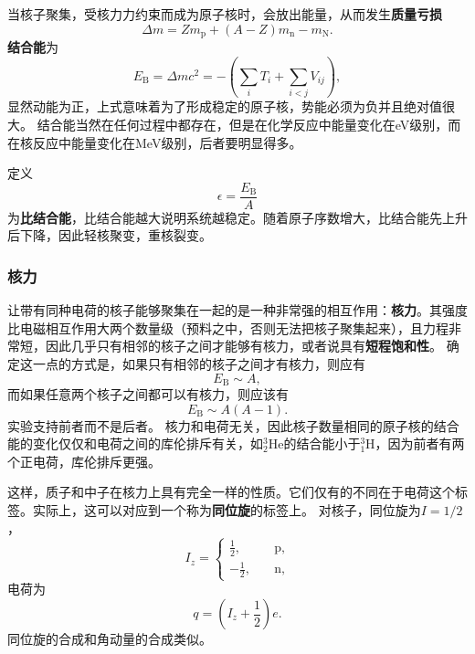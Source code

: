 \documentclass[UTF8, a4paper]{ctexart}
\newcommand*{\nuclear}[3]{^{#2}_{#3}\text{#1}}
\begin{document}
当核子聚集，受核力力约束而成为原子核时，会放出能量，从而发生\textbf{质量亏损}
\begin{equation}
    \Delta m = Z m_\text{p} + (A - Z) m_\text{n} - m_\text{N}.
\end{equation}
\textbf{结合能}为
\begin{equation}
    E_\text{B} = \Delta m c^2 = - \left( \sum_i T_i + \sum_{i < j} V_{ij} \right), 
\end{equation}
显然动能为正，上式意味着为了形成稳定的原子核，势能必须为负并且绝对值很大。
结合能当然在任何过程中都存在，但是在化学反应中能量变化在eV级别，而在核反应中能量变化在MeV级别，后者要明显得多。

定义
\begin{equation}
    \epsilon = \frac{E_\text{B}}{A} 
\end{equation}
为\textbf{比结合能}，比结合能越大说明系统越稳定。随着原子序数增大，比结合能先上升后下降，因此轻核聚变，重核裂变。

\subsubsection{核力}

让带有同种电荷的核子能够聚集在一起的是一种非常强的相互作用：\textbf{核力}。其强度比电磁相互作用大两个数量级（预料之中，否则无法把核子聚集起来），且力程非常短，因此几乎只有相邻的核子之间才能够有核力，或者说具有\textbf{短程饱和性}。
确定这一点的方式是，如果只有相邻的核子之间才有核力，则应有
\[
    E_\text{B} \sim A,
\]
而如果任意两个核子之间都可以有核力，则应该有
\[
    E_\text{B} \sim A(A-1).
\]
实验支持前者而不是后者。
核力和电荷无关，因此核子数量相同的原子核的结合能的变化仅仅和电荷之间的库伦排斥有关，如$\nuclear{He}{3}{2}$的结合能小于$\nuclear{H}{3}{1}$，因为前者有两个正电荷，库伦排斥更强。

这样，质子和中子在核力上具有完全一样的性质。它们仅有的不同在于电荷这个标签。实际上，这可以对应到一个称为\textbf{同位旋}的标签上。
对核子，同位旋为$I = 1/ 2$，
\begin{equation}
    I_z = \begin{cases}
        \frac{1}{2}, \quad &\text{p}, \\
        -\frac{1}{2}, \quad &\text{n},
    \end{cases}
\end{equation}
电荷为
\begin{equation}
    q = \left( I_z + \frac{1}{2} \right) e.
\end{equation}
同位旋的合成和角动量的合成类似。
\end{document}
